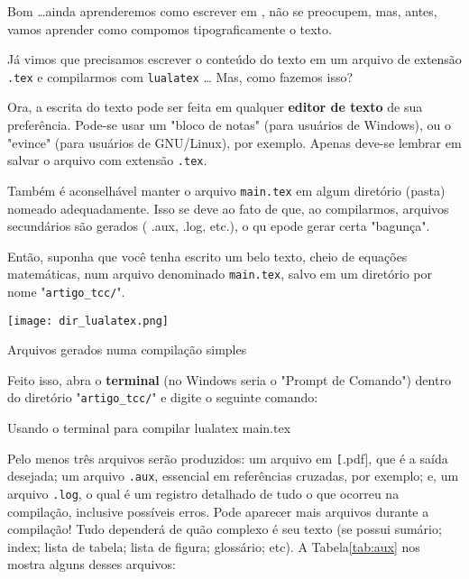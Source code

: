 Bom \ldots ainda aprenderemos como escrever em , não se preocupem,
mas, antes, vamos aprender como compomos tipograficamente o texto.

Já vimos que precisamos escrever o conteúdo do texto em um arquivo de extensão
\texttt{.tex} e compilarmos com \texttt{lualatex} \ldots 
Mas, como fazemos isso?

Ora, a escrita do texto pode ser feita em qualquer \textbf{editor de texto} de 
sua preferência.
Pode-se usar um "bloco de notas" (para usuários de Windows), ou o "evince" (para
usuários de GNU/Linux), por exemplo.
Apenas deve-se lembrar em salvar o arquivo com extensão \texttt{.tex}.

Também é aconselhável manter o arquivo \texttt{main.tex} em algum diretório (pasta) 
nomeado adequadamente.
Isso se deve ao fato de que, ao compilarmos, arquivos secundários são gerados (
.aux, .log, etc.), o qu epode gerar certa "bagunça".

Então, suponha que você tenha escrito um belo texto, cheio de equações matemáticas,
num arquivo denominado \texttt{main.tex}, salvo em um diretório por nome 
"\texttt{artigo\_tcc/}".
\begin{marginfigure}
  \centering
  \texttt{[image: dir\_lualatex.png]}
  \caption{Arquivos gerados numa compilação simples}
\end{marginfigure}
Feito isso, abra o \textbf{terminal} (no Windows seria o "Prompt de Comando") 
dentro do diretório "\texttt{artigo\_tcc/}" e digite o seguinte comando:

\begin{codigo}{Usando o terminal para compilar}{\lapis}
  lualatex main.tex
\end{codigo}

Pelo menos três arquivos serão produzidos: um arquivo em \texttt[.pdf], que é a 
saída desejada; um arquivo \texttt{.aux}, essencial em referências cruzadas, por 
exemplo; e, um arquivo \texttt{.log}, o qual é um registro detalhado de tudo o que
ocorreu na compilação, inclusive possíveis erros.
Pode aparecer mais arquivos durante a compilação!
Tudo dependerá de quão complexo é seu texto (se possui sumário; index; lista de tabela;
lista de figura; glossário; etc).
A Tabela\ref{tab:aux} nos mostra alguns desses arquivos:

